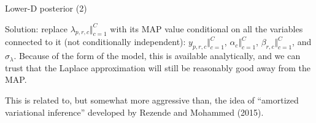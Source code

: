 \documentclass[
  ignorenonframetext,
]{beamer}
\begin{document}
\begin{frame}{Lower-D posterior (2)}
\protect\hypertarget{lower-d-posterior-2}{}

Solution: replace \(\lambda_{p,r,c}\Vert_{c=1}^C\) with its MAP value
conditional on all the variables connected to it (not conditionally
independent): \(y_{p,r,c}\Vert_{c=1}^C\), \(\alpha_c\Vert_{c=1}^C\),
\(\beta_{r,c}\Vert_{c=1}^C\), and \(\sigma_\lambda\). Because of the
form of the model, this is available analytically, and we can trust that
the Laplace approximation will still be reasonably good away from the
MAP.

This is related to, but somewhat more aggressive than, the idea of
``amortized variational inference'' developed by Rezende and Mohammed
(2015).

\end{frame}
\end{document}
